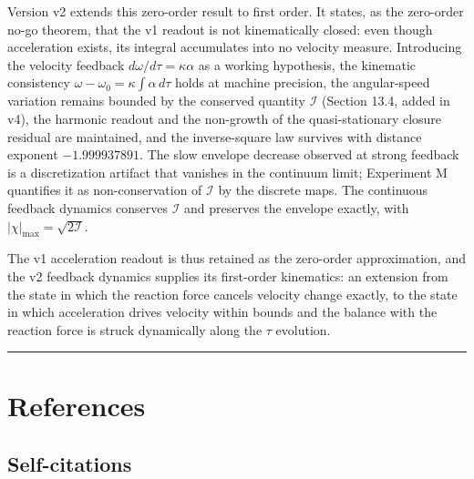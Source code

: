 \documentclass[
  a4paper,
]{article}
\begin{document}
Version v2 extends this zero-order result to first order. It states, as
the zero-order no-go theorem, that the v1 readout is not kinematically
closed: even though acceleration exists, its integral accumulates into
no velocity measure. Introducing the velocity feedback
\(d\omega/d\tau=\kappa\alpha\) as a working hypothesis, the kinematic
consistency \(\omega-\omega_0=\kappa\int\alpha\,d\tau\) holds at machine
precision, the angular-speed variation remains bounded by the conserved
quantity \(\mathcal I\) (Section 13.4, added in v4), the harmonic
readout and the non-growth of the quasi-stationary closure residual are
maintained, and the inverse-square law survives with distance exponent
\(-1.999937891\). The slow envelope decrease observed at strong feedback
is a discretization artifact that vanishes in the continuum limit;
Experiment M quantifies it as non-conservation of \(\mathcal I\) by the
discrete maps. The continuous feedback dynamics conserves \(\mathcal I\)
and preserves the envelope exactly, with
\(\lvert\chi\rvert_{\max}=\sqrt{2\mathcal I}\).

The v1 acceleration readout is thus retained as the zero-order
approximation, and the v2 feedback dynamics supplies its first-order
kinematics: an extension from the state in which the reaction force
cancels velocity change exactly, to the state in which acceleration
drives velocity within bounds and the balance with the reaction force is
struck dynamically along the \(\tau\) evolution.

\begin{center}\rule{0.5\linewidth}{0.5pt}\end{center}

\section{References}\label{references}

\subsection{Self-citations}\label{self-citations}
\end{document}
